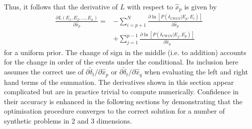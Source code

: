 \documentclass[extra]{gji}
\begin{document}
Thus, it follows that the derivative of $L$ with respect to $\hat{x}_p$ is given by
\begin{equation}
\label{eq-derivative-Lstar-cwionly}
\begin{array}{ll}
\frac{\partial L(E_1, E_2, ..., E_n)}{\partial \hat{x}_p} = &
- \sum_{i=p+1}^{N} \frac{ \partial \ln \left[P(\delta_{CWIN}|E_p,E_i)\right]}{\partial \hat{x}_p} \\
 & + \sum_{j=1}^{p-1} \frac{ \partial \ln \left[P(\delta_{CWIN}|E_j,E_p)\right]}{\partial \hat{x}_p}
\end{array}
\end{equation}
%
for a uniform prior. The change of sign in the middle (i.e. to addition) accounts for the change in
order of the events under the conditional. Its inclusion here assumes the correct use of
$\partial \widetilde{\delta}_t / \partial \hat{x}_p$
or
$\partial \widetilde{\delta}_t / \partial \hat{x}_q$
when evaluating the left and right hand terms of the summation. The derivatives shown in this section
appear complicated but are in practice trivial to compute numerically.
Confidence in their accuracy is enhanced in the following sections by demonstrating that
the optimisation procedure converges to the correct solution for a number of synthetic problems
in 2 and 3 dimensions.


\clearpage









\label{lastpage}
\end{document}
